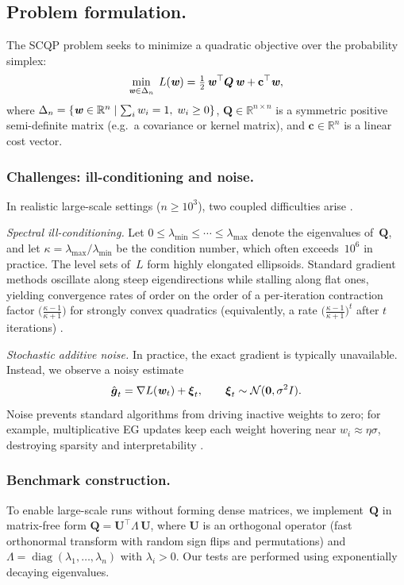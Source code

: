 \documentclass[10pt]{amsart}
\newcommand{\bi}[1]{\textbf{\textit{#1}}}
\newcommand{\bg}{\boldsymbol{g}}
\newcommand{\bQ}{\boldsymbol{Q}}
\newcommand{\bU}{\boldsymbol{U}}
\theoremstyle{definition}
\theoremstyle{definition}	 %
\begin{document}
\subsection{Problem formulation.}
The SCQP problem seeks to minimize a quadratic objective over the
probability simplex:
\begin{equation}\label{eq:SCQP}
  \min_{\bi w\in\Delta_n}\;
  L(\bi w)=\tfrac{1}{2}\,\bi w^\top \bQ\,\bi w
  +\mathbf{c}^\top\bi w,
\end{equation}
where $\Delta_n=\{\bi w\in\mathbb{R}^n\mid\sum_i w_i=1,\;w_i\ge 0\}$,
$\bQ\in\mathbb{R}^{n\times n}$ is a symmetric positive semi-definite
matrix (e.g.\ a covariance or kernel matrix), and
$\mathbf{c}\in\mathbb{R}^n$ is a linear cost vector.

\subsubsection{Challenges: ill-conditioning and noise.}
In realistic large-scale settings ($n\ge 10^3$), two coupled
difficulties arise \cite{Nemirowsky}.

\emph{Spectral ill-conditioning.}
Let $0\le\lambda_{\min}\le\cdots\le\lambda_{\max}$ denote the
eigenvalues of~$\bQ$, and let
$\kappa=\lambda_{\max}/\lambda_{\min}$ be the condition number,
which often exceeds~$10^6$ in practice.
The level sets of~$L$ form highly elongated ellipsoids. Standard
gradient methods oscillate along steep eigendirections while stalling
along flat ones, yielding convergence rates of order
on the order of a per-iteration contraction factor
$\bigl(\frac{\kappa-1}{\kappa+1}\bigr)$ for strongly convex quadratics
(equivalently, a rate $\bigl(\frac{\kappa-1}{\kappa+1}\bigr)^t$ after
$t$ iterations) \cite{Nemirowsky,Beck2003}.

\emph{Stochastic additive noise.}
In practice, the exact gradient is typically unavailable.  Instead, we
observe a noisy estimate
\begin{equation}\label{eq:noisy-grad}
  \hat{\bg}_t = \nabla L(\bi w_t)+\boldsymbol{\xi}_t,\qquad
  \boldsymbol{\xi}_t\sim\mathcal{N}(\mathbf{0},\sigma^2 I).
\end{equation}
Noise prevents standard algorithms from driving inactive weights to
zero; for example, multiplicative EG updates keep each weight hovering
near $w_i\approx\eta\sigma$, destroying sparsity and
interpretability \cite{EG}.

\subsubsection{Benchmark construction.}
To enable large-scale runs without forming dense matrices, we
implement~$\bQ$ in matrix-free form
$\bQ=\bU^\top\!\Lambda\, \bU$,
where $\bU$ is an orthogonal operator (fast orthonormal transform with
random sign flips and permutations) and
$\Lambda=\operatorname{diag}(\lambda_1,\dots,\lambda_n)$ with
$\lambda_i>0$.
Our tests are performed using exponentially decaying eigenvalues.
 
\end{document}
